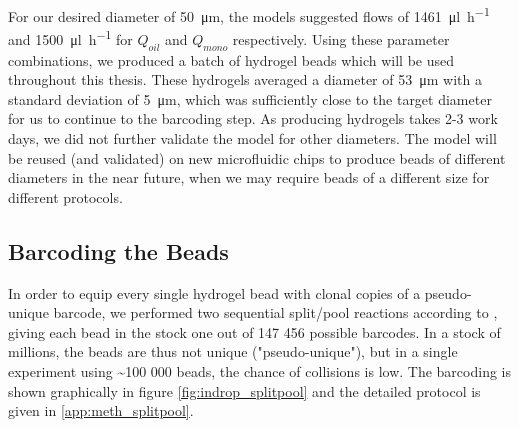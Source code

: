 %
For our desired diameter of \SI{50}{\micro\metre}, the models suggested flows of \SI[per-mode=symbol]{1461}{\micro\litre\per\hour} and \SI[per-mode=symbol]{1500}{\micro\litre\per\hour} for $Q_{oil}$ and $Q_{mono}$ respectively. Using these parameter combinations, we produced a batch of hydrogel beads which will be used throughout this thesis. These hydrogels averaged a diameter of \SI{53}{\micro\metre} with a standard deviation of \SI{5}{\micro\metre}, which was sufficiently close to the target diameter for us to continue to the barcoding step. As producing hydrogels takes 2-3 work days, we did not further validate the model for other diameters. The model will be reused (and validated) on new microfluidic chips to produce beads of different diameters in the near future, when we may require beads of a different size for different protocols.


\clearpage
\subsection{Barcoding the Beads}
\label{subsect:indrop_barcoding}
In order to equip every single hydrogel bead with clonal copies of a pseudo-unique barcode, we performed two sequential split/pool reactions according to \cite{zilionis2017}, giving each bead in the stock one out of 147 456 possible barcodes. In a stock of millions, the beads are thus not unique ("pseudo-unique"), but in a single experiment using \textasciitilde{100 000} beads, the chance of collisions is low. The barcoding is shown graphically in figure \ref{fig:indrop_splitpool} and the detailed protocol is given in \ref{app:meth_splitpool}.\pms

